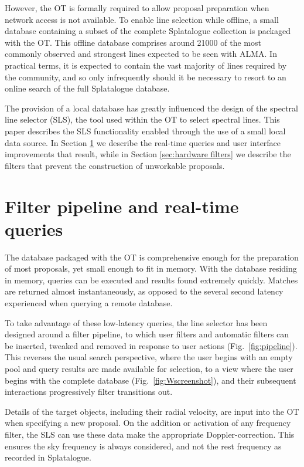 However, the OT is formally required to allow proposal preparation when network access is not available. To enable line selection while offline, a small database containing a subset of the complete Splatalogue collection is packaged with the OT. This offline database comprises around 21000 of the most commonly observed and strongest lines expected to be seen with ALMA. In practical terms, it is expected to contain the vast majority of lines required by the community, and so only infrequently should it be necessary to resort to an online search of the full Splatalogue database. 

The provision of a local database has greatly influenced the design of the spectral line selector (SLS), the tool used within the OT to select spectral lines. This paper describes the SLS functionality enabled through the use of a small local data source. In Section \ref{sec:real-time queries}  we describe the real-time queries and user interface improvements that result, while in Section \ref{sec:hardware filters} we describe the filters that prevent the construction of unworkable proposals.

\section{Filter pipeline and real-time queries}
\label{sec:real-time queries}
The database packaged with the OT is comprehensive enough for the preparation of most proposals, yet small enough to fit in memory. With the database residing in memory, queries can be executed and results found extremely quickly. Matches are returned almost instantaneously, as opposed to the several second latency experienced when querying a remote database. 

To take advantage of these low-latency queries, the line selector has been designed around a filter pipeline, to which user filters and automatic filters can be inserted, tweaked and removed in response to user actions (Fig.~\ref{fig:pipeline}). This reverses the usual search perspective, where the user begins with an empty pool and query results are made available for selection, to a view where the user begins with the complete database (Fig.~\ref{fig:Wscreenshot}), and their subsequent interactions progressively filter transitions out. 

Details of the target objects, including their radial velocity, are input into the OT when specifying a new proposal. On the addition or activation of any frequency filter, the SLS can use these data make the appropriate Doppler-correction. This ensures the sky frequency is always considered, and not the rest frequency as recorded in Splatalogue.

